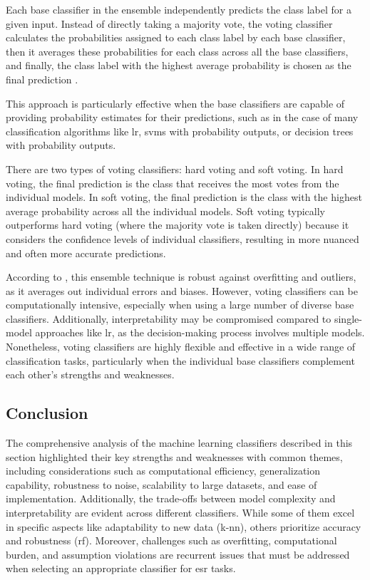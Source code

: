 Each base classifier in the ensemble independently predicts the class label for a given input. Instead of directly taking a majority vote, the voting classifier calculates the probabilities assigned to each class label by each base classifier, then it averages these probabilities for each class across all the base classifiers, and finally, the class label with the highest average probability is chosen as the final prediction \cite{Sarkar2019}.

This approach is particularly effective when the base classifiers are capable of providing probability estimates for their predictions, such as in the case of many classification algorithms like \gls{lr}, \gls{svm}s with probability outputs, or decision trees with probability outputs.

There are two types of voting classifiers: hard voting and soft voting. In hard voting, the final prediction is the class that receives the most votes from the individual models. In soft voting, the final prediction is the class with the highest average probability across all the individual models. Soft voting typically outperforms hard voting (where the majority vote is taken directly) because it considers the confidence levels of individual classifiers, resulting in more nuanced and often more accurate predictions.

According to \textcite{Sarkar2019}, this ensemble technique is robust against overfitting and outliers, as it averages out individual errors and biases. However, voting classifiers can be computationally intensive, especially when using a large number of diverse base classifiers. Additionally, interpretability may be compromised compared to single-model approaches like \gls{lr}, as the decision-making process involves multiple models. Nonetheless, voting classifiers are highly flexible and effective in a wide range of classification tasks, particularly when the individual base classifiers complement each other's strengths and weaknesses.


\subsection{Conclusion}
\label{subsec:machine_learning_conclusion}

The comprehensive analysis of the machine learning classifiers described in this section highlighted their key strengths and weaknesses with common themes, including considerations such as computational efficiency, generalization capability, robustness to noise, scalability to large datasets, and ease of implementation.  Additionally, the trade-offs between model complexity and interpretability are evident across different classifiers. While some of them excel in specific aspects like adaptability to new data (\gls{k-nn}), others prioritize accuracy and robustness (\gls{rf}). Moreover, challenges such as overfitting, computational burden, and assumption violations are recurrent issues that must be addressed when selecting an appropriate classifier for \gls{esr} tasks. 


